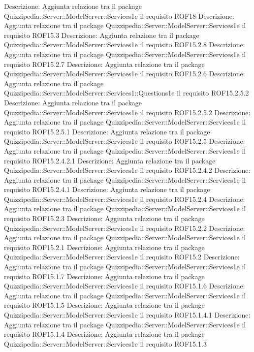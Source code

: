 Descrizione: Aggiunta relazione tra il package Quizzipedia::Server::ModelServer::Services1e il requisito ROF18 
Descrizione: Aggiunta relazione tra il package Quizzipedia::Server::ModelServer::Services1e il requisito ROF15.3 
Descrizione: Aggiunta relazione tra il package Quizzipedia::Server::ModelServer::Services1e il requisito ROF15.2.8 
Descrizione: Aggiunta relazione tra il package Quizzipedia::Server::ModelServer::Services1e il requisito ROF15.2.7 
Descrizione: Aggiunta relazione tra il package Quizzipedia::Server::ModelServer::Services1e il requisito ROF15.2.6 
Descrizione: Aggiunta relazione tra il package Quizzipedia::Server::ModelServer::Services1::Questions1e il requisito ROF15.2.5.2 
Descrizione: Aggiunta relazione tra il package Quizzipedia::Server::ModelServer::Services1e il requisito ROF15.2.5.2 
Descrizione: Aggiunta relazione tra il package Quizzipedia::Server::ModelServer::Services1e il requisito ROF15.2.5.1 
Descrizione: Aggiunta relazione tra il package Quizzipedia::Server::ModelServer::Services1e il requisito ROF15.2.5 
Descrizione: Aggiunta relazione tra il package Quizzipedia::Server::ModelServer::Services1e il requisito ROF15.2.4.2.1 
Descrizione: Aggiunta relazione tra il package Quizzipedia::Server::ModelServer::Services1e il requisito ROF15.2.4.2 
Descrizione: Aggiunta relazione tra il package Quizzipedia::Server::ModelServer::Services1e il requisito ROF15.2.4.1 
Descrizione: Aggiunta relazione tra il package Quizzipedia::Server::ModelServer::Services1e il requisito ROF15.2.4 
Descrizione: Aggiunta relazione tra il package Quizzipedia::Server::ModelServer::Services1e il requisito ROF15.2.3 
Descrizione: Aggiunta relazione tra il package Quizzipedia::Server::ModelServer::Services1e il requisito ROF15.2.2 
Descrizione: Aggiunta relazione tra il package Quizzipedia::Server::ModelServer::Services1e il requisito ROF15.2.1 
Descrizione: Aggiunta relazione tra il package Quizzipedia::Server::ModelServer::Services1e il requisito ROF15.2 
Descrizione: Aggiunta relazione tra il package Quizzipedia::Server::ModelServer::Services1e il requisito ROF15.1.7 
Descrizione: Aggiunta relazione tra il package Quizzipedia::Server::ModelServer::Services1e il requisito ROF15.1.6 
Descrizione: Aggiunta relazione tra il package Quizzipedia::Server::ModelServer::Services1e il requisito ROF15.1.5 
Descrizione: Aggiunta relazione tra il package Quizzipedia::Server::ModelServer::Services1e il requisito ROF15.1.4.1 
Descrizione: Aggiunta relazione tra il package Quizzipedia::Server::ModelServer::Services1e il requisito ROF15.1.4 
Descrizione: Aggiunta relazione tra il package Quizzipedia::Server::ModelServer::Services1e il requisito ROF15.1.3 
